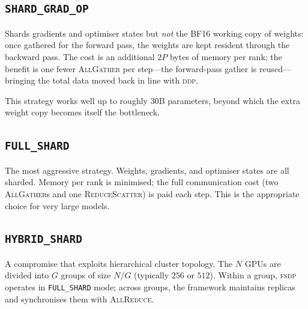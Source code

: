 \documentclass[11pt,a4paper]{article}
\theoremstyle{definition}
\theoremstyle{remark}
\newcommand{\FSDP}{\textsc{fsdp}}
\newcommand{\DDP}{\textsc{ddp}}
\newcommand{\AllGather}{\textsc{AllGather}}
\newcommand{\ReduceScatter}{\textsc{ReduceScatter}}
\newcommand{\AllReduce}{\textsc{AllReduce}}
\begin{document}
\subsection{\texttt{SHARD\_GRAD\_OP}}

Shards gradients and optimiser states but \emph{not} the \textsc{BF16} working copy of weights: once gathered for the forward pass, the weights are kept resident through the backward pass. The cost is an additional $2P$ bytes of memory per rank; the benefit is one fewer \AllGather{} per step---the forward-pass gather is reused---bringing the total data moved back in line with \DDP{}.

This strategy works well up to roughly $30$B parameters, beyond which the extra weight copy becomes itself the bottleneck.

\subsection{\texttt{FULL\_SHARD}}

The most aggressive strategy. Weights, gradients, and optimiser states are all sharded. Memory per rank is minimised; the full communication cost (two \AllGather{}s and one \ReduceScatter{}) is paid each step. This is the appropriate choice for very large models.

\subsection{\texttt{HYBRID\_SHARD}}

A compromise that exploits hierarchical cluster topology. The $N$ GPUs are divided into $G$ groups of size $N/G$ (typically $256$ or $512$). Within a group, \FSDP{} operates in \texttt{FULL\_SHARD} mode; across groups, the framework maintains replicas and synchronises them with \AllReduce{}.
\end{document}
